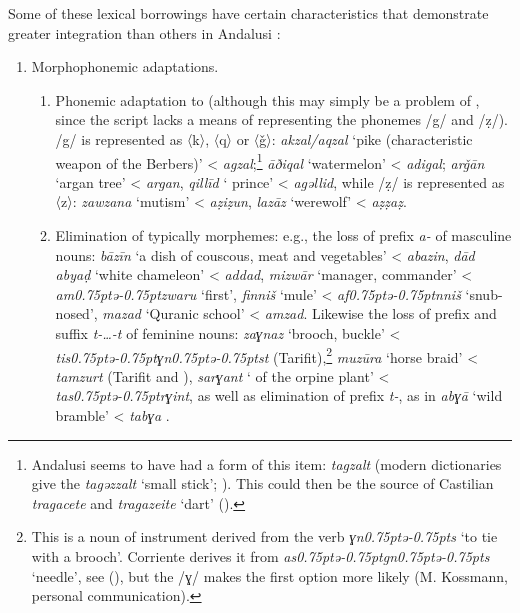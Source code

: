 \documentclass[output=paper,modfonts,nonflat]{langsci/langscibook}
\begin{document}
Some of these lexical borrowings have certain characteristics that demonstrate greater integration than others in Andalusi : 

\begin{enumerate}
\item Morphophonemic adaptations.

\begin{enumerate}
\item Phonemic adaptation to  (although this may simply be a problem of , since the  script lacks a means of representing the  phonemes /g/ and /ẓ/). /g/ is represented as 〈k〉, 〈q〉 or 〈ǧ〉: \textit{akzal/aqzal} ‘pike (characteristic weapon of the Berbers)’ < \textit{agzal};\footnote{Andalusi  seems to have had a  form of this item: \textit{tagzalt} (modern dictionaries give the  \textit{tagǝzzalt} ‘small stick’; \citealt{Taïfi1991}). This could then be the source of Castilian \textit{tragacete} and  \textit{tragazeite} ‘dart’ (\citealt{CorrientePereiraVicenteforthcoming}).}  \textit{āðiqal} ‘watermelon’ < \textit{adigal}; \textit{arǧān} ‘argan tree’ < \textit{argan}, \textit{qillīd} ‘ prince’ < \textit{agǝllid}, while /ẓ/ is represented as 〈z〉: \textit{zawzana} ‘mutism’ < \textit{aẓiẓun}, \textit{lazāz} ‘werewolf’ < \textit{aẓẓaẓ}. 

\item Elimination of typically  morphemes: e.g., the loss of prefix \textit{a-} of masculine nouns: \textit{bāzīn} ‘a dish of couscous, meat and vegetables’ < \textit{abazin}, \textit{dād} \textit{abyaḍ} ‘white chameleon’ < \textit{addad}, \textit{mizwār} ‘manager, commander’ < \textit{am\kern 0.75ptǝ\kern -0.75ptzwaru} ‘first’, \textit{finniš} `mule' < \textit{af\kern 0.75ptǝ\kern -0.75ptnniš} `snub-nosed', \textit{mazad} ‘Quranic school’ < \textit{amzad}. Likewise the loss of prefix and suffix \textit{t-…-t} of feminine nouns: \textit{zaɣnaz} ‘brooch, buckle’ < \textit{tis\kern 0.75ptǝ\kern -0.75ptɣn\kern 0.75ptǝ\kern -0.75ptst} (Tarifit),\footnote{This is a noun of instrument derived from the verb \textit{ɣn\kern 0.75ptǝ\kern -0.75pts} ‘to tie with a brooch’. Corriente derives it from \textit{as\kern 0.75ptǝ\kern -0.75ptgn\kern 0.75ptǝ\kern -0.75pts} ‘needle’, see (\citealt{CorrientePereiraVicenteforthcoming}), but the  /ɣ/ makes the first option more likely (M. Kossmann, personal communication).} \textit{muzūra} ‘horse braid’ < \textit{tamzurt} (Tarifit and ), \textit{sarɣant} ‘ of the orpine plant’ < \textit{tas\kern 0.75ptǝ\kern -0.75ptrɣint}, as well as elimination of prefix \textit{t-}, as in \textit{abɣā} ‘wild bramble’ < \textit{tabɣa} . 
\end{enumerate}


\end{enumerate}
\end{document}
